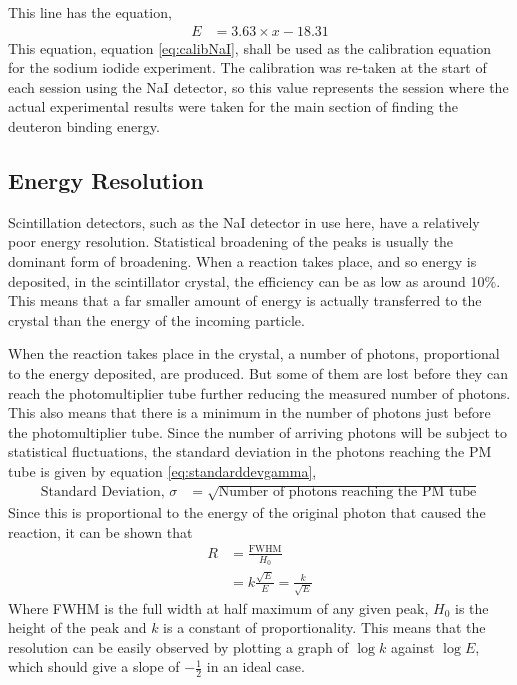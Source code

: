 This line has the equation,
\begin{align}
	E &= 3.63\times x - 18.31 \label{eq:calibNaI}
\end{align}
This equation, equation \ref{eq:calibNaI}, shall be used as the calibration equation for the sodium iodide experiment. The calibration was re-taken at the start of each session using the NaI detector, so this value represents the session where the actual experimental results were taken for the main section of finding the deuteron binding energy.

\subsection{Energy Resolution} %
\label{sub:energy_resolution}
Scintillation detectors, such as the NaI detector in use here, have a relatively poor energy resolution. Statistical broadening of the peaks is usually the dominant form of broadening. When a reaction takes place, and so energy is deposited, in the scintillator crystal, the efficiency can be as low as around 10\%. This means that a far smaller amount of energy is actually transferred to the crystal than the energy of the incoming particle.

When the reaction takes place in the crystal, a number of photons, proportional to the energy deposited, are produced. But some of them are lost before they can reach the photomultiplier tube further reducing the measured number of photons. This also means that there is a minimum in the number of photons just before the photomultiplier tube. Since the number of arriving photons will be subject to statistical fluctuations, the standard deviation in the photons reaching the PM tube is given by equation \ref{eq:standarddevgamma},
\begin{align}
	\text{Standard Deviation, }\sigma &= \sqrt{\text{Number of photons reaching the PM tube}}\label{eq:standarddevgamma}
\end{align}
Since this is proportional to the energy of the original photon that caused the reaction, it can be shown that
\begin{align}
	R &= \frac{\text{FWHM}}{H_0} \\
	&= k\frac{\sqrt E}{E} = \frac{k}{\sqrt E}
\end{align}
Where FWHM is the full width at half maximum of any given peak, $H_0$ is the height of the peak and $k$ is a constant of proportionality. This means that the resolution can be easily observed by plotting a graph of $\log k$ against $\log E$, which should give a slope of $-\frac{1}{2}$ in an ideal case.

